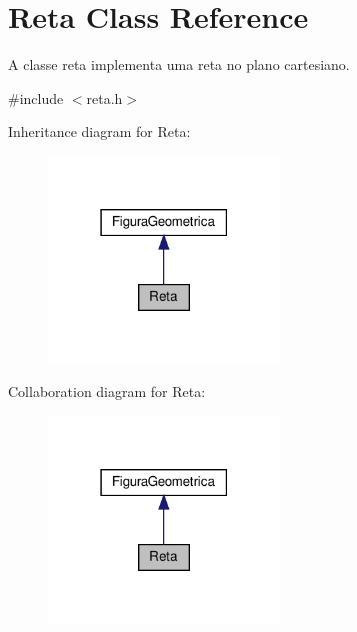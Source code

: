 \hypertarget{class_reta}{}\section{Reta Class Reference}
\label{class_reta}


A classe reta implementa uma reta no plano cartesiano.  




{\ttfamily \#include $<$reta.\+h$>$}



Inheritance diagram for Reta\+:\nopagebreak
\begin{figure}[H]
\begin{center}
\leavevmode
\includegraphics[width=174pt]{class_reta__inherit__graph}
\end{center}
\end{figure}


Collaboration diagram for Reta\+:\nopagebreak
\begin{figure}[H]
\begin{center}
\leavevmode
\includegraphics[width=174pt]{class_reta__coll__graph}
\end{center}
\end{figure}
